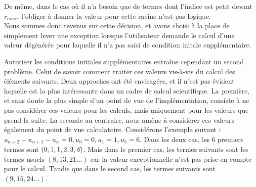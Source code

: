 \documentclass[12pt]{article}
\begin{document}
        De même, dans le cas où il n'a besoin que de termes dont l'indice est petit devant
        $r_{max}$, l'obliger à donner la valeur pour cette racine n'est pas logique.\\
        Nous sommes donc revenus sur cette décision, et avons choisi à la place de simplement
        lever une exception lorsque l'utilisateur demande le calcul d'une valeur dégénérée
        pour laquelle il n'a pas saisi de condition initale supplémentaire.
        \par Autoriser les conditions initiales supplémentaires entraîne cependant un second
        problème. Celui de savoir comment traiter ces valeurs vis-à-vis du calcul des
        éléments suivants. Deux approches ont été envisagées, et il n'est pas évident
        laquelle est la plus intéressante dans un cadre de calcul scientifique.
        La première, et sans doute la plus simple d'un point de vue de l'implémentation,
        consiste à ne pas considérer ces valeurs pour les calculs, mais uniquement
        pour les valeurs que prend la suite. La seconde au contraire, nous amène à considérer
        ces valeurs également du point de vue calculatoire. Considérons l'exemple suivant :
        $u_{n+2} - u_{n+1} - u_n = 0, u_0=0, u_1=1, u_5=6$. Dans les deux cas, les 6 premiers
        termes sont $(0,1,1,2,3,\emph{6})$. Mais dans le premier cas, les termes suivants sont
        les termes usuels $(8,13,21...)$ car la valeur exceptionnelle n'est pas prise en
        compte pour le calcul. Tandis que dans le second cas, les termes suivants sont
        $(9,15,24...)$.
\end{document}
